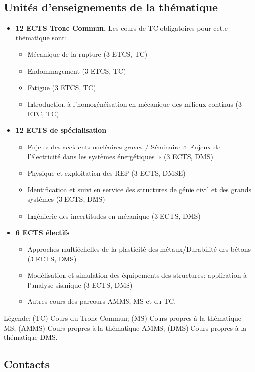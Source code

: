 \documentclass[french,11pt]{article}
\begin{document}
\subsection{Unités d'enseignements de la thématique}
\begin{itemize}
\item
  \textbf{12 ECTS Tronc Commun.} Les cours de TC obligatoires pour cette thématique sont:

  \begin{itemize}
  \item
    Mécanique de la rupture (3 ETCS, TC)
  \item
    Endommagement (3 ETCS, TC)
  \item
    Fatigue (3 ETCS, TC)
  \item
    Introduction à l’homogénéisation en mécanique des milieux continus (3 ETC, TC)
  \end{itemize}
\item
  \textbf{12 ECTS de spécialisation}

  \begin{itemize}
  \item
    Enjeux des accidents nucléaires graves / Séminaire «~Enjeux de
    l'électricité dans les systèmes énergétiques~» (3 ECTS, DMS)
  \item
    Physique et exploitation des REP (3 ECTS, DMSE)
  \item
    Identification et suivi en service des structures de génie civil et
    des grands systèmes (3 ECTS, DMS)
  \item
    Ingénierie des incertitudes en mécanique (3 ECTS, DMS)
  \end{itemize}
\item
  \textbf{6 ECTS électifs}

  \begin{itemize}
  \item
    Approches multiéchelles de la plasticité des métaux/Durabilité des
    bétons (3 ECTS, DMS)
  \item
    Modélisation et simulation des équipements des structures:
    application à l'analyse sismique (3 ECTS, DMS)
  \item
    Autres cours des parcours AMMS, MS et du TC.
  \end{itemize}
\end{itemize}
\noindent Légende: (TC) Cours du Tronc Commun; (MS) Cours propres à la thématique MS; (AMMS) Cours propres à la thématique AMMS; (DMS) Cours propres à la thématique DMS. 
\subsection{Contacts}
\end{document}
